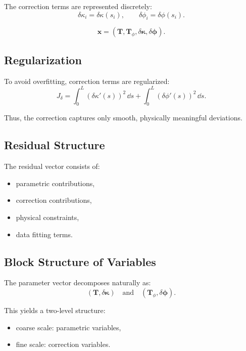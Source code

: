 The correction terms are represented discretely:
\[
\delta\kappa_i = \delta\kappa(s_i),
\qquad
\delta\phi_i = \delta\phi(s_i).
\]

\begin{definition}
\[
\mathbf{x}
=
(\mathbf{T}, \mathbf{T}_\phi, \delta\boldsymbol{\kappa}, \delta\boldsymbol{\phi}).
\]
\end{definition}

\subsection{Regularization}

To avoid overfitting, correction terms are regularized:
\[
J_{\delta}
=
\int_0^L (\delta\kappa'(s))^2 \,\dd s
+
\int_0^L (\delta\phi'(s))^2 \,\dd s.
\]

Thus, the correction captures only smooth, physically meaningful
deviations.

\subsection{Residual Structure}

The residual vector consists of:
\begin{itemize}
\item parametric contributions,
\item correction contributions,
\item physical constraints,
\item data fitting terms.
\end{itemize}

\subsection{Block Structure of Variables}

The parameter vector decomposes naturally as:
\[
(\mathbf{T}, \delta\boldsymbol{\kappa})
\quad \text{and} \quad
(\mathbf{T}_\phi, \delta\boldsymbol{\phi}).
\]

This yields a two-level structure:
\begin{itemize}
\item coarse scale: parametric variables,
\item fine scale: correction variables.
\end{itemize}

